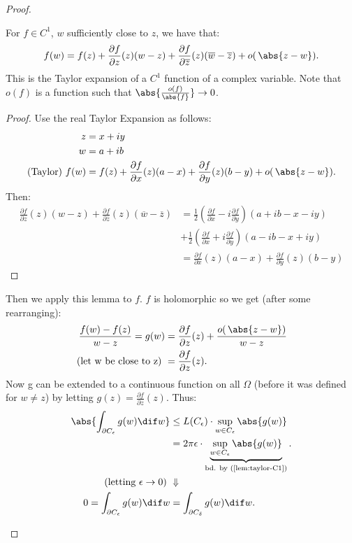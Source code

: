 \begin{proof}
\begin{enumerate}
    \begin{lemma}\label{lem:taylor-C1} %
    For $f \in C^1$, $w$ sufficiently close to $z$, we have that:
    \begin{align*}
    f(w) = f(z) + \frac{\partial f}{ \partial z} (z) (w-z) + \frac{ \partial f}{ \partial \overline{z} } (z) (\overline{w}-\overline{z})+ o( \, \abs{ z-w } ).
    \end{align*}
    This is the Taylor expansion of a $C^1$ function of a complex variable. Note that $o(f)$ is a function such that $\abs{\frac{o(f)}{\abs{f}}} \rightarrow 0$.
    \end{lemma}
    \begin{proof}
    Use the real Taylor Expansion as follows:    
    \begin{align*}
        z&=x+iy\\
        w&=a+ib\\
        \text{(Taylor) } f(w) &= f(z) + \frac{\partial f }{\partial x}(z)(a-x)+ \frac{\partial f }{\partial y}(z)(b-y) +o( \, \abs{ z-w }).
    \end{align*}
    Then:
    \begin{align*}
        \frac{\partial f}{ \partial z} (z) (w-z) + \frac{ \partial f}{ \partial \overline{z} } (z) (\overline{w}-\overline{z}) &=  \frac{1}{2}\left( \frac{\partial f}{\partial x} - i\frac{\partial f}{\partial y}\right)(a+ib-x-iy)\\
        &+ \frac{1}{2}\left( \frac{\partial f}{\partial x} + i\frac{\partial f}{\partial y}\right)(a-ib-x+iy)\\
        &= \frac{\partial f }{\partial x}(z)(a-x)+ \frac{\partial f }{\partial y}(z)(b-y)
    \end{align*}
    \end{proof}
    
    Then we apply this lemma to $f$. $f$ is holomorphic so we get (after some rearranging):
    \begin{align*}
        \frac{f(w)-f(z)}{w-z} = g(w) &= \frac{\partial f}{\partial z}(z) + \frac{o( \, \abs{ z-w } ) }{w-z}\\
        \text{(let w be close to z) }&=\frac{\partial f}{\partial z}(z).
    \end{align*}
    Now g can be extended to a continuous function on all $\Omega$ (before it was defined for $w \neq z$) by letting $g(z) = \frac{\partial f}{\partial z}(z)$. Thus:
    \begin{align*}
        \abs{\int_{\partial C_\epsilon} g(w)  \dif w} &\leq L(C_\epsilon) \cdot \sup_{w\in C_\epsilon} \abs{g(w)}\\
        &= 2\pi \epsilon \cdot \underbrace{\sup_{w\in C_\epsilon} \abs{g(w)}}_{\text{bd. by (\ref{lem:taylor-C1})}}. \\
        \text{(letting $\epsilon \rightarrow 0$) } & \Downarrow\\
        0 = \int_{\partial C_\epsilon} g(w)  \dif w &= \int_{\partial C_\delta} g(w)  \dif w.
    \end{align*}
    

\end{enumerate}
\end{proof}
